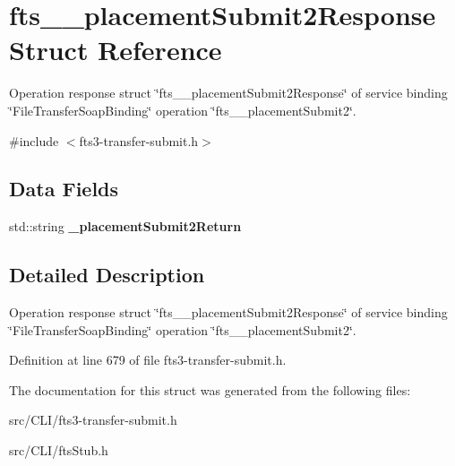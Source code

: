 \section{fts\_\-\_\-placementSubmit2Response Struct Reference}
\label{structfts____placementSubmit2Response}


Operation response struct \char`\"{}fts\_\-\_\-placementSubmit2Response\char`\"{} of service binding \char`\"{}FileTransferSoapBinding\char`\"{} operation \char`\"{}fts\_\-\_\-placementSubmit2\char`\"{}.  




{\ttfamily \#include $<$fts3-\/transfer-\/submit.h$>$}

\subsection*{Data Fields}
\begin{DoxyCompactItemize}
\item 
std::string {\bfseries \_\-placementSubmit2Return}\label{structfts____placementSubmit2Response_af2294469f117428aac84e5e9411684b0}

\end{DoxyCompactItemize}


\subsection{Detailed Description}
Operation response struct \char`\"{}fts\_\-\_\-placementSubmit2Response\char`\"{} of service binding \char`\"{}FileTransferSoapBinding\char`\"{} operation \char`\"{}fts\_\-\_\-placementSubmit2\char`\"{}. 

Definition at line 679 of file fts3-\/transfer-\/submit.h.



The documentation for this struct was generated from the following files:\begin{DoxyCompactItemize}
\item 
src/CLI/fts3-\/transfer-\/submit.h\item 
src/CLI/ftsStub.h\end{DoxyCompactItemize}
